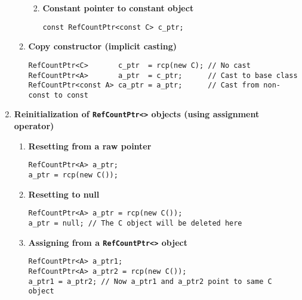 \documentclass[pdf,ps2pdf,11pt]{SANDreport}
\begin{document}
\begin{enumerate}
\begin{enumerate}
\begin{enumerate}
{\begin{verbatim}
\end{verbatim}}
%
\item {\bf Constant pointer to constant object }
{\small\begin{verbatim}
const RefCountPtr<const C> c_ptr;
\end{verbatim}}
%
\end{enumerate}
%
\item {\bf Copy constructor (implicit casting)}
%
{\small\begin{verbatim}
RefCountPtr<C>       c_ptr  = rcp(new C); // No cast
RefCountPtr<A>       a_ptr  = c_ptr;      // Cast to base class
RefCountPtr<const A> ca_ptr = a_ptr;      // Cast from non-const to const
\end{verbatim}}
%
\end{enumerate}

\item {\bf Reinitialization of \texttt{RefCountPtr<>} objects (using assignment operator)}
%
\begin{enumerate}
%
\item {\bf Resetting from a raw pointer}
%
{\small\begin{verbatim}
RefCountPtr<A> a_ptr;
a_ptr = rcp(new C());
\end{verbatim}}
%
\item {\bf Resetting to null}
%
{\small\begin{verbatim}
RefCountPtr<A> a_ptr = rcp(new C());
a_ptr = null; // The C object will be deleted here
\end{verbatim}}
%
\item {\bf Assigning from a \texttt{RefCountPtr<>} object}
%
{\small\begin{verbatim}
RefCountPtr<A> a_ptr1;
RefCountPtr<A> a_ptr2 = rcp(new C());
a_ptr1 = a_ptr2; // Now a_ptr1 and a_ptr2 point to same C object
\end{verbatim}}
%
\end{enumerate}


\end{enumerate}
\end{document}
